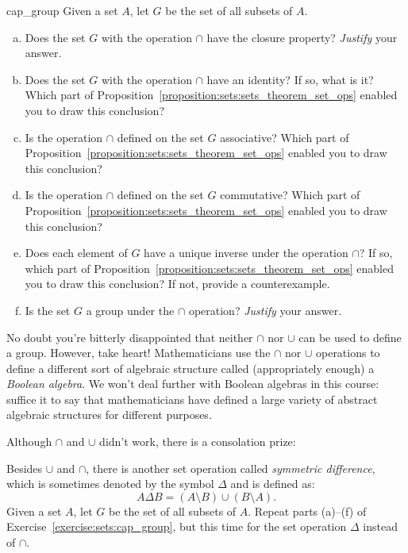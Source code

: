 \begin{exercise}{cap_group}
Given a set $A$, let $G$ be the set of all subsets of $A$. 
\begin{enumerate}[(a)]
\item
Does the set $G$  with the operation $\cap$ have the closure property? \emph{Justify} your answer.
\item
Does the set $G$  with the operation $\cap$ have an identity? If so, what is it? Which part of  Proposition~\ref{proposition:sets:sets_theorem_set_ops} enabled you to draw this conclusion?
\item
Is the operation $\cap$ defined on the set $G$ associative? Which part of  Proposition~\ref{proposition:sets:sets_theorem_set_ops} enabled you to draw this conclusion?
\item
Is the operation $\cap$ defined on the set $G$ commutative? Which part of  Proposition~\ref{proposition:sets:sets_theorem_set_ops} enabled you to draw this conclusion?
\item
Does each element of $G$ have a unique inverse under the operation $\cap$? If so, which part of  Proposition~\ref{proposition:sets:sets_theorem_set_ops} enabled you to draw this conclusion? If not, provide a counterexample.
\item
Is the set $G$ a group under the $\cap$ operation?  \emph{Justify} your answer.
\end{enumerate}
\end{exercise} 
 

No doubt you're bitterly disappointed that neither $\cap$ nor $\cup$ can be used to define a group. However, take heart! Mathematicians use the $\cap$ nor $\cup$ operations to define a different sort of algebraic structure called (appropriately enough) a \emph{Boolean algebra}. We won't deal further with Boolean algebras in this course: suffice it to say that mathematicians have defined a large variety of abstract algebraic structures for different purposes.

Although $\cap$ and $\cup$ didn't work, there is a consolation prize:
 
\begin{exercise}{}
 Besides $\cup$ and $\cap$, there is another set operation called \emph{symmetric difference}, which is sometimes denoted by the symbol $\Delta$ and is defined as:
\begin{equation*}
A \Delta B = (A \setminus B) \cup (B\setminus A).
\end{equation*}
Given a set $A$, let $G$ be the set of all subsets of $A$.  Repeat parts (a)--(f) of Exercise~\ref{exercise:sets:cap_group}, but this time for the set operation $\Delta$ instead of $\cap$.
\end{exercise} 

